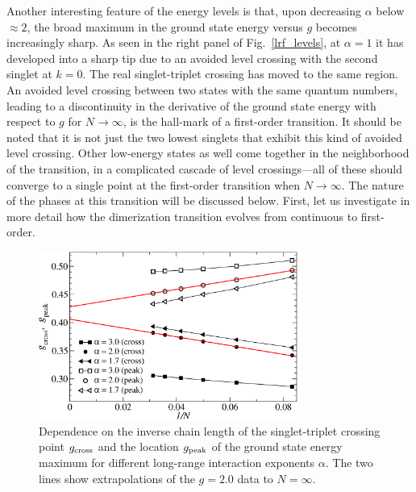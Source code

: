 \documentclass[draft,numberedheadings]{aipproc}
\begin{document}
Another interesting feature of the energy levels is that, upon decreasing $\alpha$ below $\approx 2$, the broad maximum in the ground state energy 
versus $g$  becomes increasingly sharp. As seen in the right panel of Fig.~\ref{lrf_levels}, at $\alpha=1$ it has developed into a sharp tip due to an 
avoided level crossing with the second singlet at $k=0$. The real singlet-triplet crossing has moved to the same region. An avoided level crossing 
between two states with the same quantum numbers, leading to a discontinuity in the derivative of the ground state energy with respect to $g$ for 
$N\to \infty$, is the hall-mark of a first-order transition. It should be noted that it is not just the two lowest singlets that exhibit this kind of 
avoided level crossing. Other low-energy states as well come together in the neighborhood of the transition, in a complicated cascade of level 
crossings---all of these should converge to a single point at the first-order transition when $N\to \infty$. The nature of the phases at this transition 
will be discussed below. First, let us investigate in more detail how the dimerization transition evolves from continuous to first-order.

\begin{figure}
\includegraphics[width=8.5cm, clip]{lrf_extrap.eps}
\caption{Dependence on the inverse chain length of the singlet-triplet crossing point $g_{\rm cross}$ and the location $g_{\rm peak}$ of the ground state 
energy maximum for different long-range interaction exponents $\alpha$. The two lines show extrapolations of the $g=2.0$ data to $N=\infty$.}
\label{lrf_extrap}
\end{figure}
\end{document}
